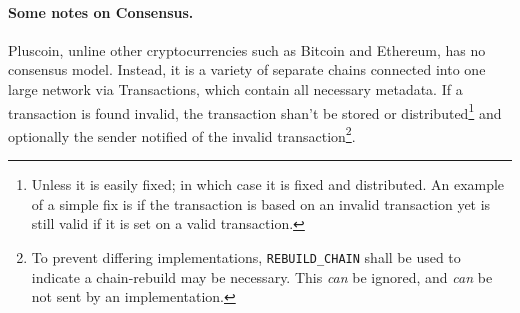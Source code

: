 \documentclass{article}
\begin{document}
\paragraph{Some notes on Consensus.} Pluscoin, unline other cryptocurrencies
such as Bitcoin and Ethereum, has no consensus model. Instead, it is a variety
of separate chains connected into one large network via Transactions,
which contain all necessary metadata. If a transaction is found invalid, the
transaction shan't be stored or distributed\footnote{Unless it is easily fixed;
in which case it is fixed and distributed. An example of a simple fix is if the
transaction is based on an invalid transaction yet is still valid if it is set
on a valid transaction.} and optionally the sender notified of the invalid
transaction\footnote {To prevent differing implementations,
\texttt{REBUILD\_CHAIN} shall be used to indicate a chain-rebuild may be
necessary. This {\it{can}} be ignored, and {\it{can}} be not sent by an
implementation.}.
\end{document}
